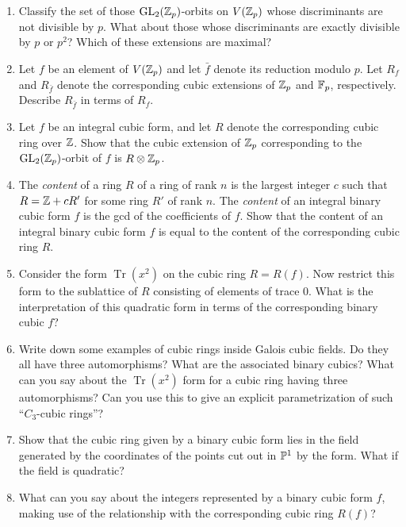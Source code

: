 \documentclass[12pt,amsfont]{amsart}
\begin{document}
\begin{enumerate}
\item Classify the set of those $\operatorname{GL}_2({\mathbb Z}_p)$-orbits on $V({\mathbb Z}_p)$
  whose discriminants are not divisible by $p$. What about those whose
  discriminants are exactly divisible by $p$ or $p^2$? Which of these
  extensions are maximal?

\item Let $f$ be an element of $V({\mathbb Z}_p)$ and let $\bar{f}$ denote its
  reduction modulo $p$. Let $R_f$ and $R_{\bar{f}}$ denote the
  corresponding cubic extensions of ${\mathbb Z}_p$ and ${\mathbb F}_p$,
  respectively. Describe $R_{\bar{f}}$ in terms of $R_f$.

\item Let $f$ be an integral cubic form, and let $R$ denote the
  corresponding cubic ring over ${\mathbb Z}$. Show that the cubic extension of
  ${\mathbb Z}_p$ corresponding to the $\operatorname{GL}_2({\mathbb Z}_p)$-orbit of $f$ is $R\otimes{\mathbb Z}_p$.

\item The {\it content} of a ring $R$ of a
ring of rank $n$ is the largest integer $c$ such that $R={\mathbb Z}+cR'$ for some
ring $R'$ of rank $n$.  The {\it content} of an integral binary cubic form
$f$ is the gcd of the coefficients of $f$.  Show that the content of an
integral binary cubic form $f$ is equal to the content of the
corresponding cubic ring $R$.

         \item Consider the form $\operatorname{Tr}(x^2)$ on the cubic
           ring $R=R(f)$.  Now restrict this form to the sublattice of $R$
            consisting of elements of trace 0.  What is the
            interpretation of this quadratic form in terms of the corresponding binary cubic $f$?
         \item Write down some examples of cubic rings inside Galois
           cubic fields.  Do they all have three automorphisms?  What
           are the associated binary cubics? What can you say about the
           $\operatorname{Tr}(x^2)$ form for a cubic ring
           having three automorphisms?  Can you use this to give an
           explicit parametrization of such ``$C_3$-cubic rings''?
         \item Show that the cubic ring given by a binary cubic form
           lies in the field generated by the coordinates of the points
           cut out in $\mathbb{P}^1$ by the form.  What if the field is
           quadratic?
         \item What can you say about the integers
           represented by a binary cubic form $f$, making use of the
           relationship with the corresponding cubic ring $R(f)$?
           

\end{enumerate}
\end{document}
